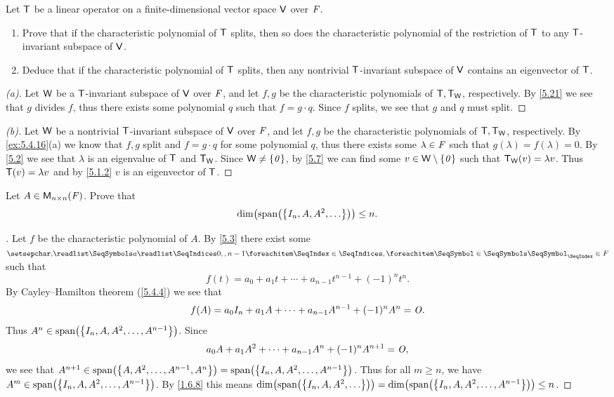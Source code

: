 \setcounter{ex}{15}
\begin{ex}\label{ex:5.4.16}
	Let \(\mathsf{T}\) be a linear operator on a finite-dimensional vector space \(\mathsf{V}\) over \(\mathit{F}\).
	\begin{enumerate}
		\item Prove that if the characteristic polynomial of \(\mathsf{T}\) splits, then so does the characteristic polynomial of the restriction of \(\mathsf{T}\) to any \(\mathsf{T}\)-invariant subspace of \(\mathsf{V}\).
		\item Deduce that if the characteristic polynomial of \(\mathsf{T}\) splits, then any nontrivial \(\mathsf{T}\)-invariant subspace of \(\mathsf{V}\) contains an eigenvector of \(\mathsf{T}\).
	\end{enumerate}
\end{ex}

\begin{proof}[(a)]
	Let \(\mathsf{W}\) be a \(\mathsf{T}\)-invariant subspace of \(\mathsf{V}\) over \(\mathit{F}\), and let \(f, g\) be the characteristic polynomials of \(\mathsf{T}, \mathsf{T}_{\mathsf{W}}\), respectively.
	By \cref{5.21} we see that \(g\) divides \(f\), thus there exists some polynomial \(q\) such that \(f = g \cdot q\).
	Since \(f\) splits, we see that \(g\) and \(q\) must split.
\end{proof}

\begin{proof}[(b)]
	Let \(\mathsf{W}\) be a nontrivial \(\mathsf{T}\)-invariant subspace of \(\mathsf{V}\) over \(\mathit{F}\), and let \(f, g\) be the characteristic polynomials of \(\mathsf{T}, \mathsf{T}_{\mathsf{W}}\), respectively.
	By \cref{ex:5.4.16}(a) we know that \(f, g\) split and \(f = g \cdot q\) for some polynomial \(q\), thus there exists some \(\lambda \in \mathit{F}\) such that \(g(\lambda) = f(\lambda) = 0\).
	By \cref{5.2} we see that \(\lambda\) is an eigenvalue of \(\mathsf{T}\) and \(\mathsf{T}_{\mathsf{W}}\).
	Since \(\mathsf{W} \neq \left\lbrace\mathit{0}\right\rbrace\), by \cref{5.7} we can find some \(v \in \mathsf{W} \setminus \left\lbrace\mathit{0}\right\rbrace\) such that \(\mathsf{T}_{\mathsf{W}}(v) = \lambda v\).
	Thus \(\mathsf{T}(v) = \lambda v\) and by \cref{5.1.2} \(v\) is an eigenvector of \(\mathsf{T}\).
\end{proof}

\begin{ex}\label{ex:5.4.17}
	Let \(A \in \ms[n][n][\F]\).
	Prove that
	\[
		\dim\pa{\spn{\set{I_n, A, A^2, \dots}}} \leq n.
	\]
\end{ex}

\begin{proof}[]
	Let \(f\) be the characteristic polynomial of \(A\).
	By \cref{5.3} there exist some \(\seq{a}{0,,n-1} \in \F\) such that
	\[
		f(t) = a_0 + a_1 t + \cdots + a_{n - 1} t^{n - 1} + (-1)^n t^n.
	\]
	By Cayley--Hamilton theorem (\cref{5.4.4}) we see that
	\[
		f(A) = a_0 I_n + a_1 A + \cdots + a_{n - 1} A^{n - 1} + (-1)^n A^n = \mathit{O}.
	\]
	Thus \(A^n \in \spn{\set{I_n, A, A^2, \dots, A^{n - 1}}}\).
	Since
	\[
		a_0 A + a_1 A^2 + \cdots + a_{n - 1} A^n + (-1)^n A^{n + 1} = \mathit{O},
	\]
	we see that \(A^{n + 1} \in \spn{\set{A, A^2, \dots, A^{n - 1}, A^n}} = \spn{\set{I_n, A, A^2, \dots, A^{n - 1}}}\).
	Thus for all \(m \geq n\), we have \(A^m \in \spn{\set{I_n, A, A^2, \dots, A^{n - 1}}}\).
	By \cref{1.6.8} this means \(\dim\pa{\spn{\set{I_n, A, A^2, \dots}}} = \dim\pa{\spn{\set{I_n, A, A^2, \dots, A^{n - 1}}}} \leq n\).
\end{proof}

